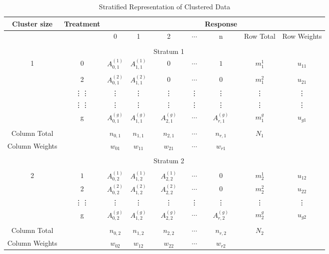 \documentclass[12pt,oneside]{report}
\theoremstyle{definition}
\theoremstyle{mystyle}
\begin{document}
\begin{table}[h!]
	\label{table:stratified1}

	\tiny
	\begin{center}
		\caption{Stratified Representation of Clustered Data}
		\begin{tabular}{c c|c c c c c c c}
			\hline
			Cluster size		&Treatment &   &  & &&Response&& \\
			[0.5ex]
			\hline
			& & 0& 1 &2&$\cdots$&n&Row  Total&Row Weights \\
			[0.5ex]
			\hline
			&&&&&&&&\\
			&&&&Stratum 1&&&&\\
			1&0&$ A_{0,1}^{(1)}$& $A_{1,1}^{(1)}$ &$0$& $\cdots$ &$1$&$m_{1}^{1}$ &$u_{11}$\\
			&&&&&&&&\\
			&2 &$ A_{0,1}^{(2)}$ & $ A_{1,1}^{(2)}$ & 0 & $\cdots$  &$0$& $m_{1}^{2}$ &$u_{21}$\\
			&\vdots\vdots&\vdots&\vdots&\vdots&\vdots&\vdots&\vdots&\vdots\\
			&\vdots\vdots&\vdots&\vdots&\vdots&\vdots&\vdots&\vdots&\vdots\\
			& g &$ A_{0,1}^{(g)}$ & $ A_{1,1}^{(g)}$ & $ A_{2,1}^{(g)}$  & $\cdots$  &$ A_{r,1}^{(g)}$&$ m^{g}_{1}$ &$u_{g1}$\\
			&&&&&&&\\
			Column Total	& & $n_{0,1}$ & $n_{1,1}$ &$n_{2,1}$& $\cdots$  & $n_{r,1}$&$N_{1}$ &\\ [1ex]
			Column Weights	& & $w_{01}$ & $w_{11}$ &$w_{21}$& $\cdots$  & $w_{r1}$& &\\ [1ex]
			
			&&&&&&&&\\
			&&&&Stratum 2&&&&\\
			&&&&&&&&\\
			2&$ 1$ & $ A_{0,2}^{(1)}$ & $ A_{1,2}^{(1)}$ & $ A_{2,2}^{(1)}$  & $\cdots$  &$0$&$m_{2}^{1}$ &$u_{12}$\\
			&2 &$ A_{0,2}^{(2)}$ & $ A_{1,2}^{(2)}$ & $ A_{2,2}^{(2)}$  & $\cdots$  &$0$&$m_{2}^{2}$&$u_{22}$ \\
			&\vdots\vdots&\vdots&\vdots&\vdots&\vdots&\vdots&\vdots&\vdots\\
			& g &$ A_{0,2}^{(g)}$ & $ A_{1,2}^{(g)}$ & $ A_{2,2}^{(g)}$  & $\cdots$  &$ A_{r,2}^{(g)}$&$m_{2}^{g}$&$u_{g2}$ \\
			&&&&&&&&\\
			Column Total	& & $n_{0,2}$ & $n_{1,2}$ &$n_{2,2}$& $\cdots$  & $n_{r,2}$&$N_{2}$ &\\ [1ex]
			Column Weights	& & $w_{02}$ & $w_{12}$ &$w_{22}$& $\cdots$  & $w_{r2}$& &\\ [1ex]
			

\end{tabular}
\end{center}
\end{table}
\end{document}
